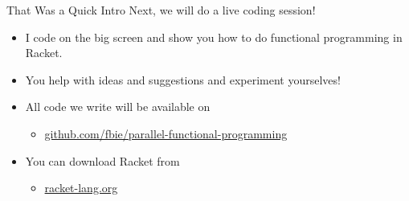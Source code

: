 \documentclass{beamer}
\begin{document}
\begin{frame}{That Was a Quick Intro}
  Next, we will do a live coding session!

  \begin{itemize}
  \pause{} \item I code on the big screen and show you how to do functional programming in Racket.
  \pause{} \item You help with ideas and suggestions and experiment yourselves!
  \pause{} \item All code we write will be available on
  \begin{itemize}
  \item \url{github.com/fbie/parallel-functional-programming}
  \end{itemize}
  \pause{} \item You can download Racket from
  \begin{itemize}
  \item \url{racket-lang.org}
  \end{itemize}
  \end{itemize}
\end{frame}
\end{document}
